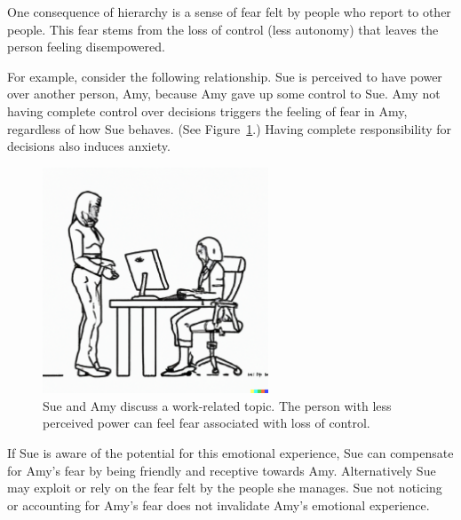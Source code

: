 One consequence of hierarchy is a sense of fear felt by people who report to other people. This fear stems from the loss of control (less autonomy) that leaves the person feeling disempowered. 

For example, consider the following relationship. Sue is perceived to have power over another person, Amy, because Amy gave up some control to Sue. Amy not having complete control over decisions triggers the feeling of fear in Amy, regardless of how Sue behaves. (See Figure~\ref{fig:subordinate_and_supervisor}.) Having complete responsibility for decisions also induces anxiety.

\begin{figure}[H]
    \centering
\includegraphics[width=0.6\textwidth,trim={0 1cm 0 0},clip]{images/female_supervisor_standing_while_talking_to_seated_female_employee_typing_on_keyboard.pdf}
    \caption{Sue and Amy discuss a work-related topic. The person with less perceived power can feel fear associated with loss of control.}
    \label{fig:subordinate_and_supervisor}
\end{figure}



If Sue is aware of the potential for this emotional experience, Sue can compensate for Amy's fear by being friendly and receptive towards Amy. Alternatively Sue may exploit or rely on the fear felt by the people she manages. Sue not noticing or accounting for Amy's fear does not invalidate Amy's emotional experience.





